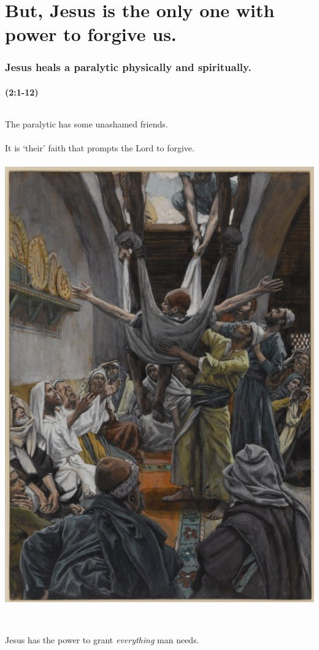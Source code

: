 \documentclass{beamer}
\begin{document}
\section{But, Jesus is the only one with power to forgive us.}
\begin{frame}
\frametitle{Jesus heals a paralytic physically and spiritually.}
\framesubtitle{(2:1-12)}
\begin{columns}
\column{5cm}
The paralytic has some unashamed friends.\\~\\
It is `their' faith that prompts the Lord to forgive.\\~\\
\column{5cm}
\includegraphics[width=\textwidth]{graphics/paralytic.jpg}
\end{columns}
\centering~\\
Jesus has the power to grant \emph{everything} man needs.
\end{frame}
\end{document}
